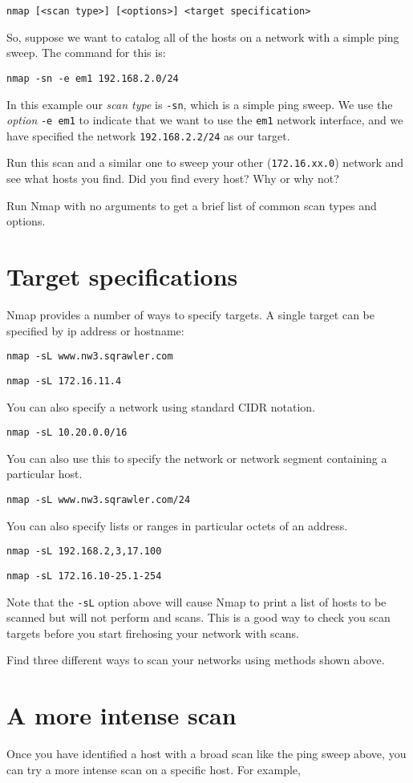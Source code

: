 \documentclass{article}
\begin{document}
\texttt{nmap [<scan type>] [<options>] <target specification>}

So, suppose we want to catalog all of the hosts on a network with a simple ping sweep.  The command for this is:

\texttt{nmap -sn -e em1 192.168.2.0/24}

In this example our \emph{scan type} is \texttt{-sn}, which is a simple ping sweep.  We use the \emph{option} \texttt{-e em1} to indicate that we want to use the \texttt{em1} network interface, and we have specified the network \texttt{192.168.2.2/24} as our target.

Run this scan and a similar one to sweep your other (\texttt{172.16.xx.0}) network and see what hosts you find.  Did you find every host?  Why or why not?


Run Nmap with no arguments to get a brief list of common scan types and options. 

\section{Target specifications}
Nmap provides a number of ways to specify targets.  A single target can be specified by ip address or hostname:

\texttt{nmap -sL www.nw3.sqrawler.com}

\texttt{nmap -sL 172.16.11.4}

You can also specify a network using standard CIDR notation.

\texttt{nmap -sL 10.20.0.0/16}

You can also use this to specify the network or network segment containing a particular host.

\texttt{nmap -sL www.nw3.sqrawler.com/24}

You can also specify lists or ranges in particular octets of an address.

\texttt{nmap -sL 192.168.2,3,17.100}

\texttt{nmap -sL 172.16.10-25.1-254}

Note that the \texttt{-sL} option above will cause Nmap to print a list of hosts to be scanned but will not perform and scans. This is a good way to check you scan targets before you start firehosing your network with scans.

Find three different ways to scan your networks using methods shown above.


\section{A more intense scan}
Once you have identified a host with a broad scan like the ping sweep above, you can try a more intense scan on a specific host. For example, 
\end{document}
